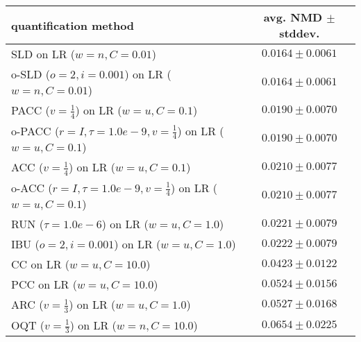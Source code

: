 \begin{tabular}{lc}
  \toprule
  quantification method & avg. NMD $\pm$ stddev. \\
  \midrule
  SLD on LR ($w=n, C=0.01$) & $\mathbf{0.0164 \pm 0.0061}$ \\
  o-SLD ($o=2, i=0.001$) on LR ($w=n, C=0.01$) & $0.0164 \pm 0.0061$ \\
  PACC ($v=\frac{1}{4}$) on LR ($w=u, C=0.1$) & $0.0190 \pm 0.0070$ \\
  o-PACC ($r=I, \tau=1.0e-9, v=\frac{1}{4}$) on LR ($w=u, C=0.1$) & $0.0190 \pm 0.0070$ \\
  ACC ($v=\frac{1}{4}$) on LR ($w=u, C=0.1$) & $0.0210 \pm 0.0077$ \\
  o-ACC ($r=I, \tau=1.0e-9, v=\frac{1}{4}$) on LR ($w=u, C=0.1$) & $0.0210 \pm 0.0077$ \\
  RUN ($\tau=1.0e-6$) on LR ($w=u, C=1.0$) & $0.0221 \pm 0.0079$ \\
  IBU ($o=2, i=0.001$) on LR ($w=u, C=1.0$) & $0.0222 \pm 0.0079$ \\
  CC on LR ($w=u, C=10.0$) & $0.0423 \pm 0.0122$ \\
  PCC on LR ($w=u, C=10.0$) & $0.0524 \pm 0.0156$ \\
  ARC ($v=\frac{1}{3}$) on LR ($w=u, C=1.0$) & $0.0527 \pm 0.0168$ \\
  OQT ($v=\frac{1}{3}$) on LR ($w=n, C=10.0$) & $0.0654 \pm 0.0225$ \\
  \bottomrule
\end{tabular}
